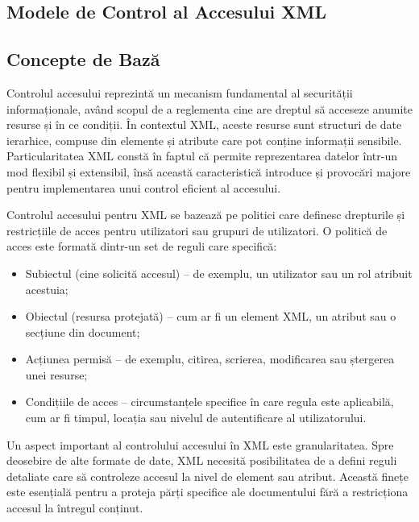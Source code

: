 \documentclass[runningheads]{llncs}
\begin{document}
\begin{spacing}{1.5}

\section{Modele de Control al Accesului XML}



\subsection{Concepte de Bază}

Controlul accesului reprezintă un mecanism fundamental al securității informa\-ționale, având scopul de a reglementa cine are dreptul să acceseze anumite resurse și în ce condiții. În contextul XML, aceste resurse sunt structuri de date ierarhice, compuse din elemente și atribute care pot conține informații sensibile. Particularitatea XML constă în faptul că permite reprezentarea datelor într-un mod flexibil și extensibil, însă această caracteristică introduce și provocări majore pentru implementarea unui control eficient al accesului.

Controlul accesului pentru XML se bazează pe politici care definesc drepturile și restricțiile de acces pentru utilizatori sau grupuri de utilizatori. O politică de acces este formată dintr-un set de reguli care specifică:

\begin{itemize}

    \item Subiectul (cine solicită accesul) – de exemplu, un utilizator sau un rol atribuit acestuia;

    \item Obiectul (resursa protejată) – cum ar fi un element XML, un atribut sau o secțiune din document;
    
    \item Acțiunea permisă – de exemplu, citirea, scrierea, modificarea sau ștergerea unei resurse;
    
    \item Condițiile de acces – circumstanțele specifice în care regula este aplicabilă, cum ar fi timpul, locația sau nivelul de autentificare al utilizatorului.
    
\end{itemize}

Un aspect important al controlului accesului în XML este granularitatea. Spre deosebire de alte formate de date, XML necesită posibilitatea de a defini reguli detaliate care să controleze accesul la nivel de element sau atribut. Această finețe este esențială pentru a proteja părți specifice ale documentului fără a restricționa accesul la întregul conținut.


\end{spacing}
\end{document}

